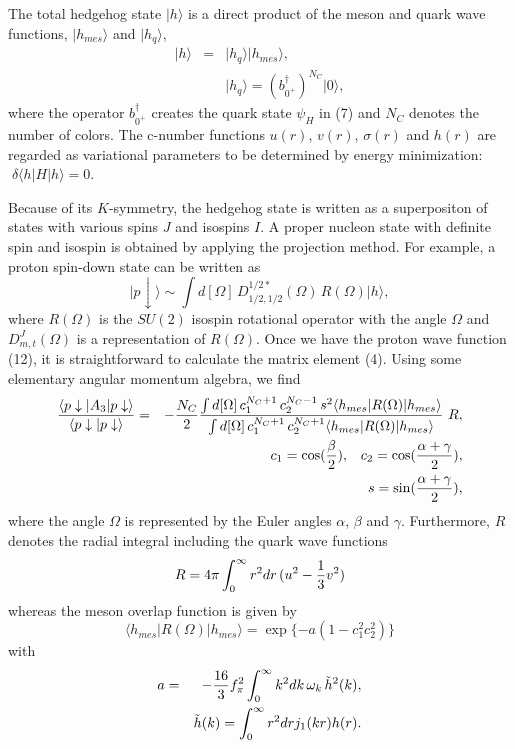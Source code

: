 The total hedgehog state
$\vert h \rangle$ is a direct product of the meson and quark wave
functions, $\vert h_{mes}\rangle$ and $\vert h_q \rangle$,
\begin{eqnarray}
\vert h \rangle & = & \vert h_q \rangle \vert h_{mes} \rangle , \\
                &   & \vert h _q \rangle = (b_{0^+}^\dagger)^{N_C}
                                   \vert 0 \rangle , \nonumber
\end{eqnarray}
where the operator $b_{0^+}^\dagger$
creates the quark state $\psi _H$ in (7) and $N_C$ denotes the
number of colors.  The c-number functions $u(r)$, $v(r)$,
$\sigma(r)$  and $h(r)$  are regarded  as variational  parameters
to be determined by  energy  minimization:
$\; \delta  \langle  h \vert  H \vert h \rangle = 0$.

Because of its $K$-symmetry, the hedgehog state is written as
a superpositon
of states with various spins $J$ and isospins $I$. A proper nucleon state
with definite spin and isospin is obtained by applying the projection
method.  For example, a proton spin-down state can be written as
\begin{equation}
\vert p \downarrow \rangle \sim \int d[ \Omega ] \,
        D^{1/2 *}_{1/2,1/2}(\Omega) \, R(\Omega) \vert h \rangle ,
\end{equation}
where $R(\Omega)$ is the $SU(2)$ isospin rotational operator with the
angle $\Omega$ and $D^J_{m,t}(\Omega)$ is a representation of
$R(\Omega)$.
Once we have the proton wave function (12), it is straightforward to
calculate the matrix element (4).  Using some elementary angular momentum
algebra, we  find 
\begin{eqnarray}
{ {\langle p \downarrow \vert A_3 \vert p \downarrow \rangle }
  \over
  {\langle p \downarrow \vert  p \downarrow \rangle } }
& = & - {N_C \over 2}
{ {\int d [ \Omega ] \, c_1^{N_C+1} \, c_2^{N_C-1} \, s^2
\langle h_{mes} \vert R(\Omega)  \vert h_{mes} \rangle  }
 \over
{\int d [ \Omega ] \, c_1^{N_C+1}  \, c_2^{N_C+1} \langle h_{mes}
\vert R(\Omega)  \vert h_{mes}  \rangle } }
 \, \, R, \\ & & c_1 =
\cos({\beta  \over 2}), \; \; \; c_2 = \cos({{\alpha  + \gamma  }
\over 2}), \nonumber  \\ & & s = \sin({{\alpha  + \gamma  } \over
2}),
 \nonumber
\end{eqnarray}
where  the  angle  $\Omega$  is
represented  by the Euler angles $\alpha$,  $\beta$ and $\gamma$.
Furthermore,  $R$ denotes the radial integral including the quark
wave functions
\begin{equation}
R = 4\pi  \int _0
^\infty r^2 dr \, (u^2 - {1 \over 3} v^2)
\end{equation}
whereas the meson overlap function is given by
\begin{equation}
\langle h_{mes} \vert
R(\Omega)  \vert h_{mes} \rangle = \exp\{ -a (1 - c_1^2 c_2^2) \}
\end{equation}
with
\begin{eqnarray}
a & = & - {{16}  \over  3}
f_\pi ^2 \int _0^\infty k^2dk\, \omega _k \, \tilde h^2(k) , \\ &
& \tilde  h (k)  = \int  _0^\infty  r^2drj_1(kr)h(r).   \nonumber
\end{eqnarray}

